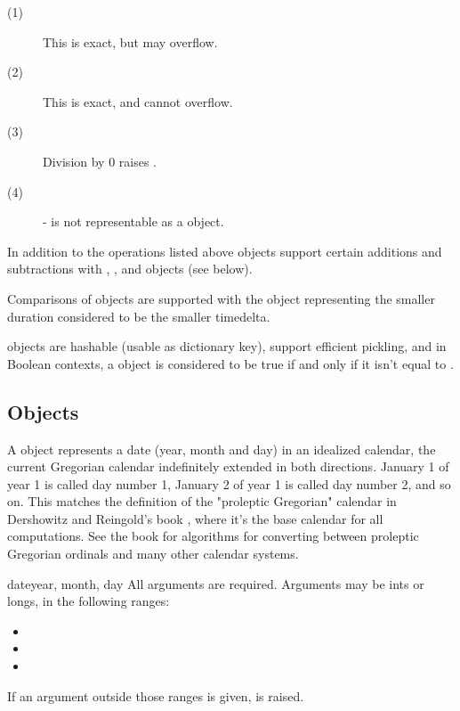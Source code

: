 \begin{description}
\item[(1)]
  This is exact, but may overflow.

\item[(2)]
  This is exact, and cannot overflow.

\item[(3)]
  Division by 0 raises .

\item[(4)]
  - is not representable as a  object.
\end{description}

In addition to the operations listed above  objects
support certain additions and subtractions with ,
, and  objects (see below).

Comparisons of  objects are supported with the
 object representing the smaller duration considered
to be the smaller timedelta.

 objects are hashable (usable as dictionary key),
support efficient pickling, and in Boolean contexts, a 
object is considered to be true if and only if it isn't equal to
.


\subsection{ Objects \label{datetime-date}}

A  object represents a date (year, month and day) in an idealized
calendar, the current Gregorian calendar indefinitely extended in both
directions.  January 1 of year 1 is called day number 1, January 2 of year
1 is called day number 2, and so on.  This matches the definition of the
"proleptic Gregorian" calendar in Dershowitz and Reingold's book
, where it's the base calendar for all
computations.  See the book for algorithms for converting between
proleptic Gregorian ordinals and many other calendar systems.

\begin{classdesc}{date}{year, month, day}
  All arguments are required.  Arguments may be ints or longs, in the
  following ranges:

  \begin{itemize}
    \item {}
    \item {}
    \item {}
  \end{itemize}

  If an argument outside those ranges is given, 
  is raised.
\end{classdesc}

